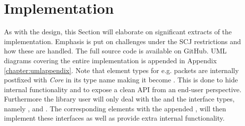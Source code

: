 \section{Implementation}
As with the design, this Section will elaborate on significant extracts of the implementation. Emphasis is put on challenges under the SCJ restrictions and how these are handled. The full source code is available on GitHub\cite{SW902e12:CSPinSCJ}. UML diagrams covering the entire implementation is appended in Appendix \ref{chapter:umlappendix}. Note that element types for e.g. packets are internally postfixed with \textit{Core} in its type name making it become . This is done to hide internal functionality and to expose a clean API from an end-user perspective. Furthermore the library user will only deal with the  and the interface types, namely ,  and . The corresponding elements with the appended , will then implement these interfaces as well as provide extra internal functionality. 